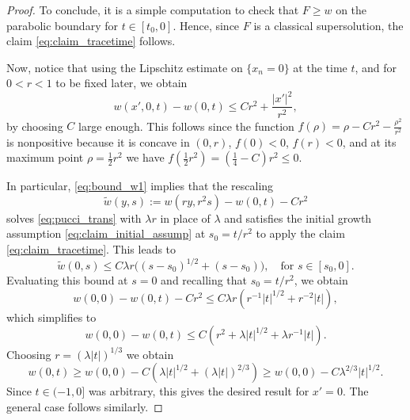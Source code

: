 \documentclass[10pt,a4paper]{amsart}
\begin{document}
\begin{proof}
    To conclude, it is a simple computation to check that $F\geq w$ on the parabolic boundary for $t \in [t_0, 0]$. Hence, since $F$ is a classical supersolution, the claim \eqref{eq:claim_tracetime} follows.

    Now, notice that using the Lipschitz estimate on $\{x_n=0 \}$ at the time $t$, and for $0<r<1$ to be fixed later, we obtain
    \begin{equation} \label{eq:bound_w1}
        w(x',0,t) - w(0,t) \leq Cr^2 + \frac{|x'|^2}{r^2},
    \end{equation}
    by choosing $C$ large enough.
    This follows since the function $f(\rho)=\rho - Cr^2-\frac{\rho^2}{r^2}$ is nonpositive because it is concave in $(0,r)$, $f(0) < 0$, $f(r) <0$, and at its maximum point $\rho=\frac{1}{2}r^2$ we have $f\left(\frac{1}{2}r^2\right)=\left(\frac{1}{4}-C\right)r^2 \leq 0.$
    
    In particular, \eqref{eq:bound_w1} implies that the rescaling 
    \[
    \tilde w(y,s):=w(ry,r^2 s)-w(0,t)-Cr^2
    \]
    solves \eqref{eq:pucci_trans} with $\lambda r$ in place of $
\lambda$ and satisfies the initial growth assumption \eqref{eq:claim_initial_assump} at $s_0=t/r^2$  to apply the claim \eqref{eq:claim_tracetime}. This leads to
    $$
    \tilde w(0,s) \leq C\lambda r \big((s - s_0)^{1/2} + (s - s_0)\big), \quad \text{for } s \in [s_0, 0].
    $$
    Evaluating  this bound at $s=0$ and recalling that $s_0=t/r^2$, we obtain
    \[
  w(0,0)-w(0,t) - Cr^2 \leq C\lambda r \left( r^{-1}|t|^{1/2} + r^{-2}|t| \right),
    \]
    which simplifies to
    \[
   w(0,0)-w(0,t) \leq C(r^2+\lambda |t|^{1/2}+\lambda r^{-1} |t|).
    \]
    Choosing $r=\left( \lambda |t|\right)^{1/3}$ we obtain
    \[
    w(0,t) \geq w(0,0) - C\left( \lambda|t|^{1/2} + \left( \lambda |t|\right)^{2/3} \right) \geq w(0,0) - C \lambda^{2/3} |t|^{1/2}.
    \]
    Since $t \in (-1,0]$ was arbitrary, this gives the desired result for $x'=0$. The general case follows similarly.
\end{proof}
\end{document}
